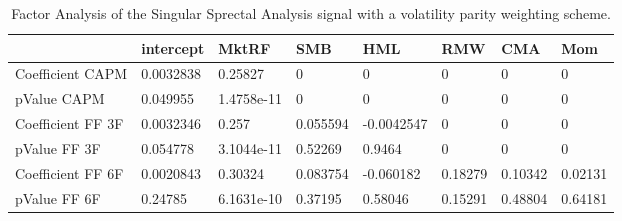 \begin{table}[H]
\centering
\begin{tabular}{llllllll}
\hline& intercept & MktRF & SMB & HML & RMW & CMA & Mom \\ 
\hline 
Coefficient CAPM & 0.0032838 & 0.25827 & 0 & 0 & 0 & 0 & 0 \\ 
pValue CAPM & 0.049955 & 1.4758e-11 & 0 & 0 & 0 & 0 & 0 \\ 
Coefficient FF 3F & 0.0032346 & 0.257 & 0.055594 & -0.0042547 & 0 & 0 & 0 \\ 
pValue FF 3F & 0.054778 & 3.1044e-11 & 0.52269 & 0.9464 & 0 & 0 & 0 \\ 
Coefficient FF 6F & 0.0020843 & 0.30324 & 0.083754 & -0.060182 & 0.18279 & 0.10342 & 0.02131 \\ 
pValue FF 6F & 0.24785 & 6.1631e-10 & 0.37195 & 0.58046 & 0.15291 & 0.48804 & 0.64181 \\ 
\hline
\end{tabular}
\caption{Factor Analysis of the Singular Sprectal Analysis signal with a volatility parity weighting scheme.}
\label{SSA_FACTOR}
\end{table}